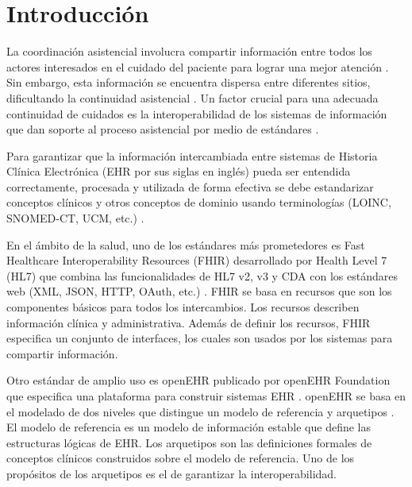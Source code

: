 \section{Introducción}

La coordinación asistencial involucra compartir información entre todos los actores interesados en el cuidado del paciente para lograr una mejor atención \cite{CareCoordination}. Sin embargo, esta información se encuentra dispersa entre diferentes sitios, dificultando la continuidad asistencial \cite{Indarte11}. Un factor crucial para una adecuada continuidad de cuidados es la interoperabilidad de los sistemas de información que dan soporte al proceso asistencial por medio de estándares \cite{OPS16}.

Para garantizar que la información intercambiada entre sistemas de Historia Clínica Electrónica (EHR por sus siglas en inglés) pueda ser entendida correctamente, procesada y utilizada de forma efectiva se debe estandarizar conceptos clínicos y otros conceptos de dominio usando terminologías (LOINC, SNOMED-CT, UCM, etc.) \cite{ISO20514}.

En el ámbito de la salud, uno de los estándares más prometedores es Fast Healthcare Interoperability Resources (FHIR) desarrollado por Health Level 7 (HL7) que combina las funcionalidades de HL7 v2, v3 y CDA con los estándares web (XML, JSON, HTTP, OAuth, etc.) \cite{FHIR}. FHIR se basa en recursos que son los componentes básicos para todos los intercambios. Los recursos describen información clínica y administrativa. Además de definir los recursos, FHIR especifica un conjunto de interfaces, los cuales son usados por los sistemas para compartir información.

Otro estándar de amplio uso es openEHR publicado por openEHR Foundation que especifica una plataforma para construir sistemas EHR \cite{openEHR}. openEHR se basa en el modelado de dos niveles que distingue un modelo de referencia y arquetipos \cite{Bale00}. El modelo de referencia es un modelo de información estable que define las estructuras lógicas de EHR. Los arquetipos son las definiciones formales de conceptos clínicos construidos sobre el modelo de referencia. Uno de los propósitos de los arquetipos es el de garantizar la interoperabilidad.

